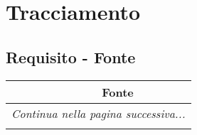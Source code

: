 \section{Tracciamento} \label{_tracciamento}

\subsection{Requisito - Fonte}

\resetCR
\begin{center}
	\begin{longtable}{|c|c|}
		\hline
		\rowcolor{lighter-grayer}{ \textbf{ID Requisito} } & {\textbf{Fonte} }        \\ \hline
		\endhead
		\multicolumn{2}{|c|}{\textit{Continua nella pagina successiva...}}            \\
		\hline
		\hline
		\endfoot
		\endlastfoot


\end{longtable}
\end{center}
